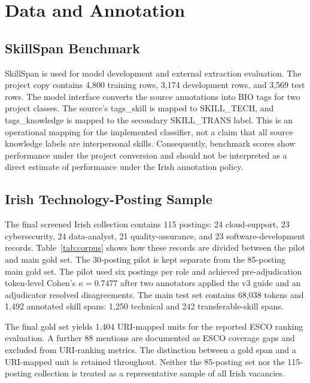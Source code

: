 \documentclass[conference]{IEEEtran}
\begin{document}
\section{Data and Annotation}
\subsection{SkillSpan Benchmark}
SkillSpan is used for model development and external extraction evaluation. The project copy contains 4,800 training rows, 3,174 development rows, and 3,569 test rows. The model interface converts the source annotations into BIO tags for two project classes. The source's \textsf{tags\_skill} is mapped to \textsf{SKILL\_TECH}, and \textsf{tags\_knowledge} is mapped to the secondary \textsf{SKILL\_TRANS} label. This is an operational mapping for the implemented classifier, not a claim that all source knowledge labels are interpersonal skills. Consequently, benchmark scores show performance under the project conversion and should not be interpreted as a direct estimate of performance under the Irish annotation policy.

\subsection{Irish Technology-Posting Sample}
The final screened Irish collection contains 115 postings: 24 cloud-support, 23 cybersecurity, 24 data-analyst, 21 quality-assurance, and 23 software-development records. Table~\ref{tab:corpus} shows how these records are divided between the pilot and main gold set. The 30-posting pilot is kept separate from the 85-posting main gold set. The pilot used six postings per role and achieved pre-adjudication token-level Cohen's $\kappa=0.7477$ after two annotators applied the v3 guide and an adjudicator resolved disagreements. The main test set contains 68,038 tokens and 1,492 annotated skill spans: 1,250 technical and 242 transferable-skill spans.

The final gold set yields 1,404 URI-mapped units for the reported ESCO ranking evaluation. A further 88 mentions are documented as ESCO coverage gaps and excluded from URI-ranking metrics. The distinction between a gold span and a URI-mapped unit is retained throughout. Neither the 85-posting set nor the 115-posting collection is treated as a representative sample of all Irish vacancies.
\end{document}

